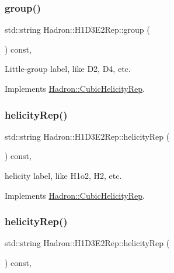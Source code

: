 \subsubsection{\texorpdfstring{group()}{group()}\hspace{0.1cm}{\footnotesize\ttfamily [5/5]}}
{\footnotesize\ttfamily std\+::string Hadron\+::\+H1\+D3\+E2\+Rep\+::group (\begin{DoxyParamCaption}{ }\end{DoxyParamCaption}) const\hspace{0.3cm}{\ttfamily [inline]}, {\ttfamily [virtual]}}

Little-\/group label, like D2, D4, etc. 

Implements \mbox{\hyperlink{structHadron_1_1CubicHelicityRep_a101a7d76cd8ccdad0f272db44b766113}{Hadron\+::\+Cubic\+Helicity\+Rep}}.

\mbox{\label{structHadron_1_1H1D3E2Rep_a9b18f2d67ec482a4a8d2adc6287a1571}} 
\subsubsection{\texorpdfstring{helicityRep()}{helicityRep()}\hspace{0.1cm}{\footnotesize\ttfamily [1/3]}}
{\footnotesize\ttfamily std\+::string Hadron\+::\+H1\+D3\+E2\+Rep\+::helicity\+Rep (\begin{DoxyParamCaption}{ }\end{DoxyParamCaption}) const\hspace{0.3cm}{\ttfamily [inline]}, {\ttfamily [virtual]}}

helicity label, like H1o2, H2, etc. 

Implements \mbox{\hyperlink{structHadron_1_1CubicHelicityRep_af1096946b7470edf0a55451cc662f231}{Hadron\+::\+Cubic\+Helicity\+Rep}}.

\mbox{\label{structHadron_1_1H1D3E2Rep_a9b18f2d67ec482a4a8d2adc6287a1571}} 
\subsubsection{\texorpdfstring{helicityRep()}{helicityRep()}\hspace{0.1cm}{\footnotesize\ttfamily [2/3]}}
{\footnotesize\ttfamily std\+::string Hadron\+::\+H1\+D3\+E2\+Rep\+::helicity\+Rep (\begin{DoxyParamCaption}{ }\end{DoxyParamCaption}) const\hspace{0.3cm}{\ttfamily [inline]}, {\ttfamily [virtual]}}


